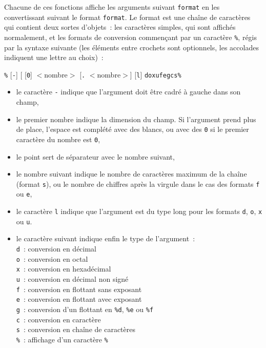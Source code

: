 \documentclass [twoside] {report}
\begin{document}
Chacune de ces fonctions affiche les arguments suivant {\tt format} en
les convertissant suivant le format {\tt format}.  Le format est une
chaîne de caractères qui contient deux sortes d'objets~:  les caractères
simples, qui sont affichés normalement, et les formats de conversion
commençant par un caractère {\tt \%}, régis par la syntaxe suivante (les
éléments entre crochets sont optionnels, les accolades indiquent une
lettre au choix)~:

{\tt \%} [{\tt -}] [ [{\tt 0}] $<$nombre$>$ [{\tt .} $<$nombre$>$] [{\tt l}] {{ {\tt doxufegcs\%} }}

\begin {itemize}
    \item le caractère {\tt -} indique que l'argument doit être cadré à
	gauche dans son champ,

    \item le premier nombre indique la dimension du champ.  Si
	l'argument prend plus de place, l'espace est complété avec des
	blancs, ou avec des {\tt 0} si le premier caractère du nombre
	est {\tt 0},

    \item le point sert de séparateur avec le nombre suivant,

    \item le nombre suivant indique le nombre de caractères maximum de
	la chaîne (format {\tt s}), ou le nombre de chiffres après la
	virgule dans le cas des formats {\tt f} ou {\tt e},

    \item le caractère {\tt l} indique que l'argument est du type long
	pour les formats {\tt d}, {\tt o}, {\tt x} ou {\tt u}.

    \item le caractère suivant indique enfin le type de l'argument~:\\
	{\tt d}~: conversion en décimal\\
	{\tt o}~: conversion en octal\\
	{\tt x}~: conversion en hexadécimal\\
	{\tt u}~: conversion en décimal non signé\\
	{\tt f}~: conversion en flottant sans exposant\\
	{\tt e}~: conversion en flottant avec exposant\\
	{\tt g}~: conversion d'un flottant en {\tt \%d}, {\tt \%e} ou {\tt \%f}\\
	{\tt c}~: conversion en caractère\\
	{\tt s}~: conversion en chaîne de caractères\\
	{\tt \%}~: affichage d'un caractère {\tt \%}

\end {itemize}
\end{document}
